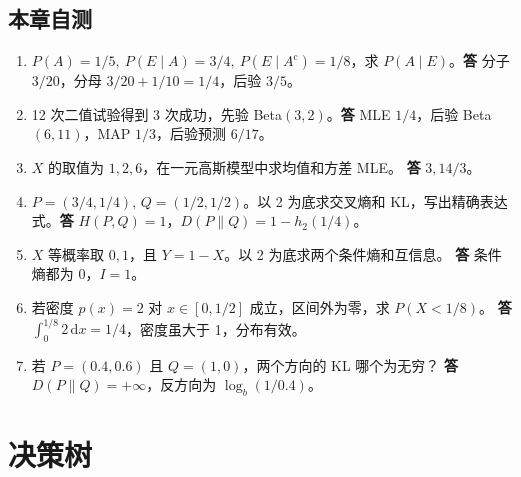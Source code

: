 \documentclass[UTF8,a4paper,zihao=-4,fontset=fandol]{ctexrep}
\begin{document}
\section{本章自测}
\begin{enumerate}[leftmargin=2em]
\item \(P(A)=1/5,\ P(E\mid A)=3/4,\ P(E\mid A^\mathrm c)=1/8\)，求 \(P(A\mid E)\)。\textbf{答} 分子 \(3/20\)，分母 \(3/20+1/10=1/4\)，后验 \(3/5\)。
\item 12 次二值试验得到 3 次成功，先验 Beta\((3,2)\)。\textbf{答} MLE \(1/4\)，后验 Beta\((6,11)\)，MAP \(1/3\)，后验预测 \(6/17\)。
\item \(X\) 的取值为 \(1,2,6\)，在一元高斯模型中求均值和方差 MLE。 \textbf{答} \(3,14/3\)。
\item \(P=(3/4,1/4),\,Q=(1/2,1/2)\)。以 2 为底求交叉熵和 KL，写出精确表达式。\textbf{答} \(H(P,Q)=1\)，\(D(P\|Q)=1-h_2(1/4)\)。
\item \(X\) 等概率取 \(0,1\)，且 \(Y=1-X\)。以 2 为底求两个条件熵和互信息。 \textbf{答} 条件熵都为 \(0\)，\(I=1\)。
\item 若密度 \(p(x)=2\) 对 \(x\in[0,1/2]\) 成立，区间外为零，求 \(P(X<1/8)\)。 \textbf{答} \(\int_0^{1/8}2\,\mathrm dx=1/4\)，密度虽大于 1，分布有效。
\item 若 \(P=(0.4,0.6)\) 且 \(Q=(1,0)\)，两个方向的 KL 哪个为无穷？ \textbf{答} \(D(P\|Q)=+\infty\)，反方向为 \(\log_b(1/0.4)\)。
\end{enumerate}

\chapter{决策树}
\label{ch:prml-tree}
\end{document}
